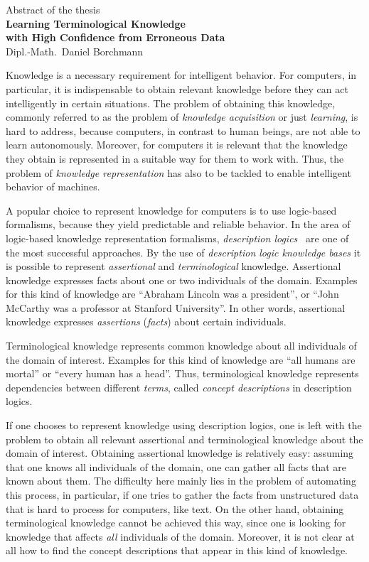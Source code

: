 \documentclass[english,fleqn]{scrartcl}
\begin{document}
\medskip
\begin{center}
  \normalsize Abstract of the thesis\\
  \LARGE\textbf{Learning Terminological Knowledge\\ with High Confidence from Erroneous
    Data}\\
  \bigskip%
  \large Dipl.-Math.\ Daniel Borchmann
\end{center}
\bigskip
\bigskip

\noindent
Knowledge is a necessary requirement for intelligent behavior.  For computers, in
particular, it is indispensable to obtain relevant knowledge before they can act
intelligently in certain situations.  The problem of obtaining this knowledge, commonly
referred to as the problem of \emph{knowledge acquisition} or just \emph{learning}, is
hard to address, because computers, in contrast to human beings, are not able to learn
autonomously.  Moreover, for computers it is relevant that the knowledge they obtain is
represented in a suitable way for them to work with.  Thus, the problem of \emph{knowledge
  representation} has also to be tackled to enable intelligent behavior of machines.

A popular choice to represent knowledge for computers is to use logic-based formalisms,
because they yield predictable and reliable behavior.  In the area of logic-based
knowledge representation formalisms, \emph{description logics}~\cite{DLhandbook} are one of
the most successful approaches.  By the use of \emph{description logic knowledge bases} it
is possible to represent \emph{assertional} and \emph{terminological} knowledge.
Assertional knowledge expresses facts about one or two individuals of the domain.
Examples for this kind of knowledge are \enquote{Abraham Lincoln was a president}, or
\enquote{John McCarthy was a professor at Stanford University}.  In other words,
assertional knowledge expresses \emph{assertions} (\emph{facts}) about certain
individuals.

Terminological knowledge represents common knowledge about all individuals of the domain
of interest.  Examples for this kind of knowledge are \enquote{all humans are mortal} or
\enquote{every human has a head}.  Thus, terminological knowledge represents dependencies
between different \emph{terms}, called \emph{concept descriptions} in description logics.

If one chooses to represent knowledge using description logics, one is left with the
problem to obtain all relevant assertional and terminological knowledge about the domain
of interest.  Obtaining assertional knowledge is relatively easy: assuming that one knows
all individuals of the domain, one can gather all facts that are known about them.  The
difficulty here mainly lies in the problem of automating this process, in particular, if
one tries to gather the facts from unstructured data that is hard to process for
computers, like text.  On the other hand, obtaining terminological knowledge cannot be
achieved this way, since one is looking for knowledge that affects \emph{all} individuals
of the domain.  Moreover, it is not clear at all how to find the concept descriptions that
appear in this kind of knowledge.
\end{document}
